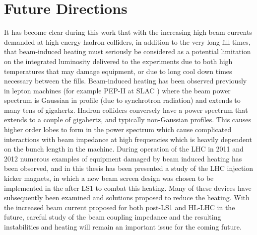\section{Future Directions}

It has become clear during this work that with the increasing high beam currents demanded at high energy hadron colliders, in addition to the very long fill times, that beam-induced heating must seriously be considered as a potential limitation on the integrated luminosity delivered to the experiments due to both high temperatures that may damage equipment, or due to long cool down times necessary between the fills. Beam-induced heating has been observed previously in lepton machines (for example PEP-II at SLAC \cite{Pivi:PEP}) where the beam power spectrum is Gaussian in profile (due to synchrotron radiation) and extends to many tens of gigahertz. Hadron colliders conversely have a power spectrum that extends to a couple of gigahertz, and typically non-Gaussian profiles. This causes higher order lobes to form in the power spectrum which cause complicated interactions with beam impedance at high frequencies which is heavily dependent on the bunch length in the machine. During operation of the LHC in 2011 and 2012 numerous examples of equipment damaged by beam induced heating has been observed, and in this thesis has been presented a study of the LHC injection kicker magnets, in which a new beam screen design was chosen to be implemented in the after LS1 to combat this heating. Many of these devices have subsequently been examined and solutions proposed to reduce the heating. With the increased beam current proposed for both post-LS1 and HL-LHC in the future, careful study of the beam coupling impedance and the resulting instabilities and heating will remain an important issue for the coming future.